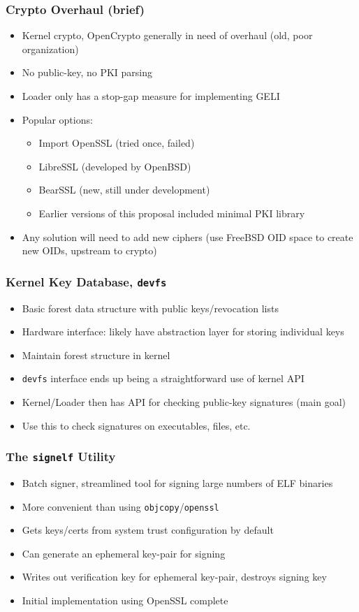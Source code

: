 \documentclass{beamer}
\begin{document}
\begin{frame}
  \frametitle{Crypto Overhaul (brief)}
  \begin{itemize}
  \item Kernel crypto, OpenCrypto generally in need of overhaul (old,
    poor organization)
  \item No public-key, no PKI parsing
  \item Loader only has a stop-gap measure for implementing GELI
  \item Popular options:
    \begin{itemize}
    \item Import OpenSSL (tried once, failed)
    \item LibreSSL (developed by OpenBSD)
    \item BearSSL (new, still under development)
    \item Earlier versions of this proposal included minimal PKI library
    \end{itemize}
  \item Any solution will need to add new ciphers (use FreeBSD OID
    space to create new OIDs, upstream to crypto)
  \end{itemize}
\end{frame}

\begin{frame}
  \frametitle{Kernel Key Database, \texttt{devfs}}
  \begin{itemize}
  \item Basic forest data structure with public keys/revocation lists
  \item Hardware interface: likely have abstraction layer for storing
    individual keys
  \item Maintain forest structure in kernel
  \item \texttt{devfs} interface ends up being a straightforward use
    of kernel API
  \item Kernel/Loader then has API for checking public-key signatures
    (main goal)
  \item Use this to check signatures on executables, files, etc.
  \end{itemize}
\end{frame}

\begin{frame}
  \frametitle{The \texttt{signelf} Utility}
  \begin{itemize}
  \item Batch signer, streamlined tool for signing large numbers of
    ELF binaries
  \item More convenient than using \texttt{objcopy}/\texttt{openssl}
  \item Gets keys/certs from system trust configuration by default
  \item Can generate an ephemeral key-pair for signing
  \item Writes out verification key for ephemeral key-pair, destroys
    signing key
  \item Initial implementation using OpenSSL complete
  \end{itemize}
\end{frame}
\end{document}
